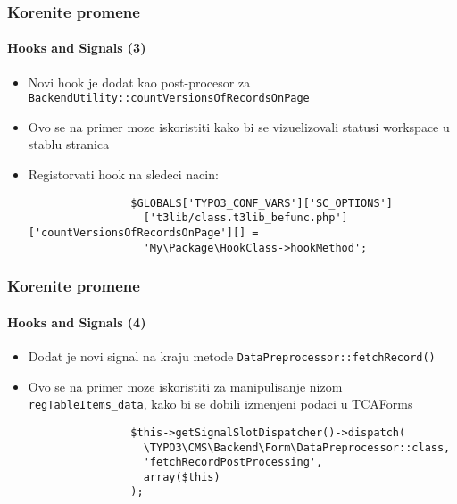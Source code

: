 
\begin{frame}[fragile]
	\frametitle{Korenite promene}
	\framesubtitle{Hooks and Signals (3)}

	\begin{itemize}

		\item Novi hook je dodat kao post-procesor za
			\small
				\texttt{BackendUtility::countVersionsOfRecordsOnPage}
			\normalsize

		\item Ovo se na primer moze iskoristiti kako bi se vizuelizovali statusi workspace u stablu stranica
		\item Registorvati hook na sledeci nacin:

			\begin{lstlisting}
				$GLOBALS['TYPO3_CONF_VARS']['SC_OPTIONS']
				  ['t3lib/class.t3lib_befunc.php']['countVersionsOfRecordsOnPage'][] =
				  'My\Package\HookClass->hookMethod';
			\end{lstlisting}

	\end{itemize}

\end{frame}


\begin{frame}[fragile]
	\frametitle{Korenite promene}
	\framesubtitle{Hooks and Signals (4)}

	\begin{itemize}

		\item Dodat je novi signal na kraju metode \texttt{DataPreprocessor::fetchRecord()}
		\item Ovo se na primer moze iskoristiti za manipulisanje nizom \texttt{regTableItems\_data},
			kako bi se dobili izmenjeni podaci u TCAForms

			\begin{lstlisting}
				$this->getSignalSlotDispatcher()->dispatch(
				  \TYPO3\CMS\Backend\Form\DataPreprocessor::class,
				  'fetchRecordPostProcessing',
				  array($this)
				);
			\end{lstlisting}

	\end{itemize}

\end{frame}

